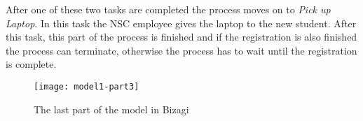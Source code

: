 After one of these two tasks are completed the process moves on to \emph{Pick up Laptop}. In this task the NSC employee gives the laptop to the new student. After this task, this part of the process is finished and if the registration is also finished the process can terminate, otherwise the process has to wait until the registration is complete.
\begin{figure}[!ht]
\begin{center}
	\texttt{[image: model1-part3]}
	\caption{The last part of the model in Bizagi}
	\label{fig:model1-part3}
\end{center}
\end{figure}
\newpage